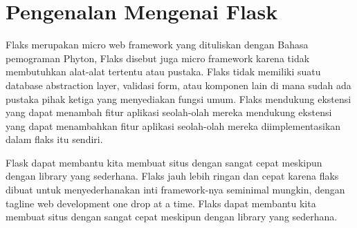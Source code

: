 
\section {Pengenalan Mengenai Flask}
Flaks merupakan micro web framework yang dituliskan dengan Bahasa pemograman Phyton, Flaks disebut juga micro framework karena tidak 
membutuhkan alat-alat tertentu atau pustaka. Flaks tidak memiliki suatu database abstraction layer, validasi form, atau komponen lain 
di mana sudah ada pustaka pihak ketiga yang menyediakan fungsi umum. Flaks mendukung ekstensi yang dapat menambah fitur aplikasi 
seolah-olah mereka mendukung ekstensi yang dapat menambahkan fitur aplikasi seolah-olah mereka diimplementasikan dalam flaks itu 
sendiri.

Flask dapat membantu kita membuat situs dengan sangat cepat meskipun dengan library yang sederhana. Flaks jauh lebih ringan dan cepat 
karena flaks dibuat untuk menyederhanakan inti framework-nya seminimal mungkin, dengan tagline web development one drop at a time. 
Flaks dapat membantu kita membuat situs dengan sangat cepat meskipun dengan library yang sederhana. 

